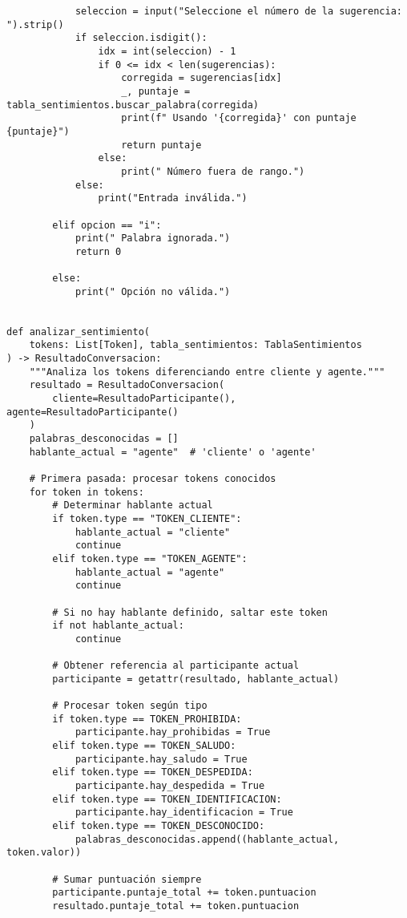 \begin{lstlisting}
            seleccion = input("Seleccione el número de la sugerencia: ").strip()
            if seleccion.isdigit():
                idx = int(seleccion) - 1
                if 0 <= idx < len(sugerencias):
                    corregida = sugerencias[idx]
                    _, puntaje = tabla_sentimientos.buscar_palabra(corregida)
                    print(f" Usando '{corregida}' con puntaje {puntaje}")
                    return puntaje
                else:
                    print(" Número fuera de rango.")
            else:
                print("Entrada inválida.")

        elif opcion == "i":
            print(" Palabra ignorada.")
            return 0

        else:
            print(" Opción no válida.")


def analizar_sentimiento(
    tokens: List[Token], tabla_sentimientos: TablaSentimientos
) -> ResultadoConversacion:
    """Analiza los tokens diferenciando entre cliente y agente."""
    resultado = ResultadoConversacion(
        cliente=ResultadoParticipante(), agente=ResultadoParticipante()
    )
    palabras_desconocidas = []
    hablante_actual = "agente"  # 'cliente' o 'agente'

    # Primera pasada: procesar tokens conocidos
    for token in tokens:
        # Determinar hablante actual
        if token.type == "TOKEN_CLIENTE":
            hablante_actual = "cliente"
            continue
        elif token.type == "TOKEN_AGENTE":
            hablante_actual = "agente"
            continue

        # Si no hay hablante definido, saltar este token
        if not hablante_actual:
            continue

        # Obtener referencia al participante actual
        participante = getattr(resultado, hablante_actual)

        # Procesar token según tipo
        if token.type == TOKEN_PROHIBIDA:
            participante.hay_prohibidas = True
        elif token.type == TOKEN_SALUDO:
            participante.hay_saludo = True
        elif token.type == TOKEN_DESPEDIDA:
            participante.hay_despedida = True
        elif token.type == TOKEN_IDENTIFICACION:
            participante.hay_identificacion = True
        elif token.type == TOKEN_DESCONOCIDO:
            palabras_desconocidas.append((hablante_actual, token.valor))

        # Sumar puntuación siempre
        participante.puntaje_total += token.puntuacion
        resultado.puntaje_total += token.puntuacion


\end{lstlisting}
